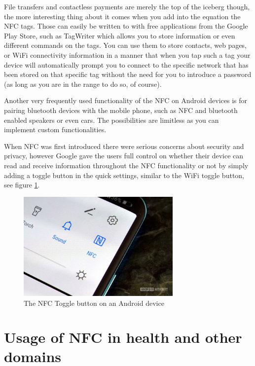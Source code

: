 File transfers and contactless payments are merely the top of the iceberg though, the more interesting thing about it comes when you add into the equation the NFC tags. Those can easily be written to with free applications from the Google Play Store, such as TagWriter which allows you to store information or even different commands on the tags. You can use them to store contacts, web pages, or WiFi connectivity information in a manner that when you tap such a tag your device will automatically prompt you to connect to the specific network that has been stored on that specific tag without the need for you to introduce a password (as long as you are in the range to do so, of course).

Another very frequently used functionality of the NFC on Android devices is for pairing bluetooth devices with the mobile phone, such as NFC and bluetooth enabled speakers or even cars. The possibilities are limitless as you can implement custom functionalities.

When NFC was first introduced there were serious concerns about security and privacy, however Google gave the users full control on whether their device can read and receive information throughout the NFC functionality or not by simply adding a toggle button in the quick settings, similar to the WiFi toggle button, see figure \ref{fig:nfcToggle}.

\begin{figure}
\centering
\includegraphics[width=80mm]{figures/nfc_toggle_button.jpg}
\caption{The NFC Toggle button on an Android device \cite{howToUseNfc}}
\label{fig:nfcToggle}
\end{figure}

\section{Usage of NFC in health and other domains}
\label{sec:ch2sec3}

